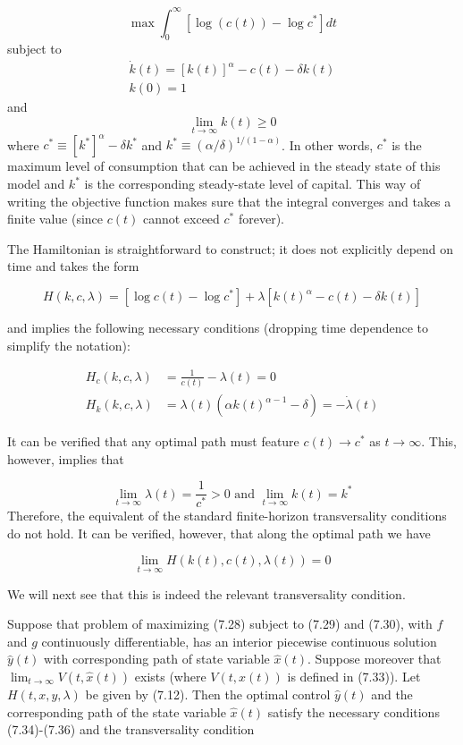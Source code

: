 \documentclass[\topdir/lecture_notes.tex]{subfiles}
\begin{document}
\[
\max \int_{0}^{\infty}\left[\log (c(t))-\log c^{*}\right] d t
\]
subject to
\[
\begin{gathered}
\dot{k}(t)=[k(t)]^{\alpha}-c(t)-\delta k(t) \\
k(0)=1
\end{gathered}
\]
and
\[
\lim _{t \rightarrow \infty} k(t) \geq 0
\]
where $c^{*} \equiv\left[k^{*}\right]^{\alpha}-\delta k^{*}$ and $k^{*} \equiv(\alpha / \delta)^{1 /(1-\alpha)}$. In other words, $c^{*}$ is the maximum level of consumption that can be achieved in the steady state of this model and $k^{*}$ is the corresponding steady-state level of capital. This way of writing the objective function makes sure that the integral converges and takes a finite value (since $c(t)$ cannot exceed $c^{*}$ forever).

The Hamiltonian is straightforward to construct; it does not explicitly depend on time and takes the form

\[
H(k, c, \lambda)=\left[\log c(t)-\log c^{*}\right]+\lambda\left[k(t)^{\alpha}-c(t)-\delta k(t)\right]
\]

and implies the following necessary conditions (dropping time dependence to simplify the notation):

\[
\begin{aligned}
H_{c}(k, c, \lambda) & =\frac{1}{c(t)}-\lambda(t)=0 \\
H_{k}(k, c, \lambda) & =\lambda(t)\left(\alpha k(t)^{\alpha-1}-\delta\right)=-\dot{\lambda}(t)
\end{aligned}
\]

It can be verified that any optimal path must feature $c(t) \rightarrow c^{*}$ as $t \rightarrow \infty$. This, however, implies that

\[
\lim _{t \rightarrow \infty} \lambda(t)=\frac{1}{c^{*}}>0 \text { and } \lim _{t \rightarrow \infty} k(t)=k^{*}
\]
Therefore, the equivalent of the standard finite-horizon transversality conditions do not hold. It can be verified, however, that along the optimal path we have

\[
\lim _{t \rightarrow \infty} H(k(t), c(t), \lambda(t))=0
\]

We will next see that this is indeed the relevant transversality condition.\\
\begin{theorem}
Suppose that problem of maximizing (7.28) subject to (7.29) and (7.30), with $f$ and $g$ continuously differentiable, has an interior piecewise continuous solution $\hat{y}(t)$ with corresponding path of state variable $\hat{x}(t)$. Suppose moreover that $\lim _{t \rightarrow \infty} V(t, \hat{x}(t))$ exists (where $V(t, x(t))$ is defined in (7.33)). Let $H(t, x, y, \lambda)$ be given by (7.12). Then the optimal control $\hat{y}(t)$ and the corresponding path of the state variable $\hat{x}(t)$ satisfy the necessary conditions (7.34)-(7.36) and the transversality condition
\end{theorem}
\end{document}
